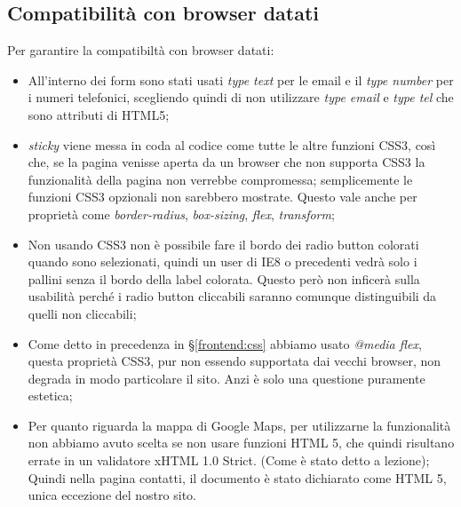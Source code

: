 \subsection{Compatibilità con browser datati}
Per garantire la compatibiltà con browser datati:
\begin{itemize}
\item All’interno dei form sono stati usati \textit{type text} per le email e il \textit{type number} per i numeri telefonici, scegliendo quindi di non utilizzare \textit{type email} e \textit{type tel} che sono attributi di HTML5;
\item \textit{sticky} viene messa in coda al codice come tutte le altre funzioni CSS3,  così che, se la pagina venisse aperta da un browser che non supporta CSS3 la funzionalità della pagina non verrebbe compromessa; semplicemente le funzioni CSS3 opzionali non sarebbero mostrate. Questo vale anche per proprietà come \textit{border-radius}, \textit{box-sizing}, \textit{flex}, \textit{transform};
\item Non usando CSS3 non è possibile fare il bordo dei radio button colorati quando sono selezionati, quindi un user di IE8 o precedenti vedrà solo i pallini senza il bordo della label colorata. Questo però non inficerà sulla usabilità perché i radio button cliccabili saranno comunque distinguibili da quelli non cliccabili;
\item Come detto in precedenza in §\ref{frontend:css} abbiamo usato \textit{@media flex}, questa proprietà CSS3, pur non essendo supportata dai vecchi browser, non degrada in modo particolare il sito. Anzi è solo una questione puramente estetica;
\item Per quanto riguarda la mappa di Google Maps, per utilizzarne la funzionalità non abbiamo avuto scelta se non usare funzioni HTML 5, che quindi risultano errate in un validatore xHTML 1.0 Strict. (Come è stato detto a lezione);
Quindi nella pagina contatti, il documento è stato dichiarato come HTML 5, unica eccezione del nostro sito.
\end{itemize}

